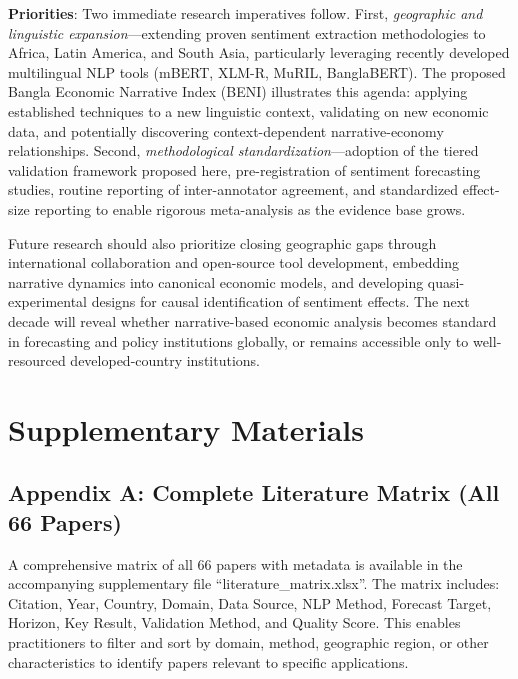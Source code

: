 \documentclass[11pt,twocolumn]{article}
\begin{document}
\textbf{Priorities}: Two immediate research imperatives follow. First, \textit{geographic and linguistic expansion}---extending proven sentiment extraction methodologies to Africa, Latin America, and South Asia, particularly leveraging recently developed multilingual NLP tools (mBERT, XLM-R, MuRIL, BanglaBERT). The proposed Bangla Economic Narrative Index (BENI) illustrates this agenda: applying established techniques to a new linguistic context, validating on new economic data, and potentially discovering context-dependent narrative-economy relationships. Second, \textit{methodological standardization}---adoption of the tiered validation framework proposed here, pre-registration of sentiment forecasting studies, routine reporting of inter-annotator agreement, and standardized effect-size reporting to enable rigorous meta-analysis as the evidence base grows.

Future research should also prioritize closing geographic gaps through international collaboration and open-source tool development, embedding narrative dynamics into canonical economic models, and developing quasi-experimental designs for causal identification of sentiment effects. The next decade will reveal whether narrative-based economic analysis becomes standard in forecasting and policy institutions globally, or remains accessible only to well-resourced developed-country institutions.

\appendix

\section{Supplementary Materials}

\subsection*{Appendix A: Complete Literature Matrix (All 66 Papers)}

A comprehensive matrix of all 66 papers with metadata is available in the accompanying supplementary file ``literature\_matrix.xlsx''. The matrix includes: Citation, Year, Country, Domain, Data Source, NLP Method, Forecast Target, Horizon, Key Result, Validation Method, and Quality Score. This enables practitioners to filter and sort by domain, method, geographic region, or other characteristics to identify papers relevant to specific applications.
\end{document}
